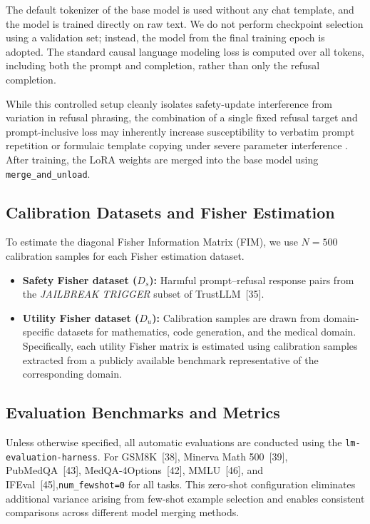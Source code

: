 \begin{itemize}
The default tokenizer of the base model is used without any chat template, and the model is trained directly on raw text. We do not perform checkpoint selection using a validation set; instead, the model from the final training epoch is adopted. The standard causal language modeling loss is computed over all tokens, including both the prompt and completion, rather than only the refusal completion. 

While this controlled setup cleanly isolates safety-update interference from variation in refusal phrasing, the combination of a single fixed refusal target and prompt-inclusive loss may inherently increase susceptibility to verbatim prompt repetition or formulaic template copying under severe parameter interference . After training, the LoRA weights are merged into the base model using \texttt{merge\_and\_unload}.

\end{itemize}

\subsection{Calibration Datasets and Fisher Estimation}
\label{app:calibration_datasets}

To estimate the diagonal Fisher Information Matrix (FIM), we use $N=500$ calibration samples for each Fisher estimation dataset.

\begin{itemize}

\item \textbf{Safety Fisher dataset ($D_s$):}
Harmful prompt--refusal response pairs from the \textit{JAILBREAK TRIGGER} subset of TrustLLM~[35].

\item \textbf{Utility Fisher dataset ($D_u$):}
Calibration samples are drawn from domain-specific datasets for mathematics, code generation, and the medical domain. Specifically, each utility Fisher matrix is estimated using calibration samples extracted from a publicly available benchmark representative of the corresponding domain.

\end{itemize}

\subsection{Evaluation Benchmarks and Metrics}
\label{app:evaluation_benchmarks}

Unless otherwise specified, all automatic evaluations are conducted using the \texttt{lm-evaluation-harness}. For GSM8K~[38], Minerva Math 500~[39], PubMedQA~[43], MedQA-4Options~[42], MMLU~[46], and IFEval~[45],\texttt{num\_fewshot=0} for all tasks. This zero-shot configuration eliminates additional variance arising from few-shot example selection and enables consistent comparisons across different model merging methods.




